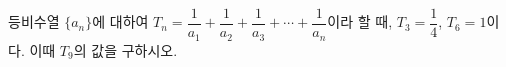 등비수열 $\{a_n\}$에 대하여 $T_n=\dfrac{1}{a_1}+\dfrac{1}{a_2}+\dfrac{1}{a_3}+\cdots+\dfrac{1}{a_n}$이라 할 때, $T_3=\dfrac{1}{4}$, $T_6=1$이다. 이때 $T_9$의 값을 구하시오.

